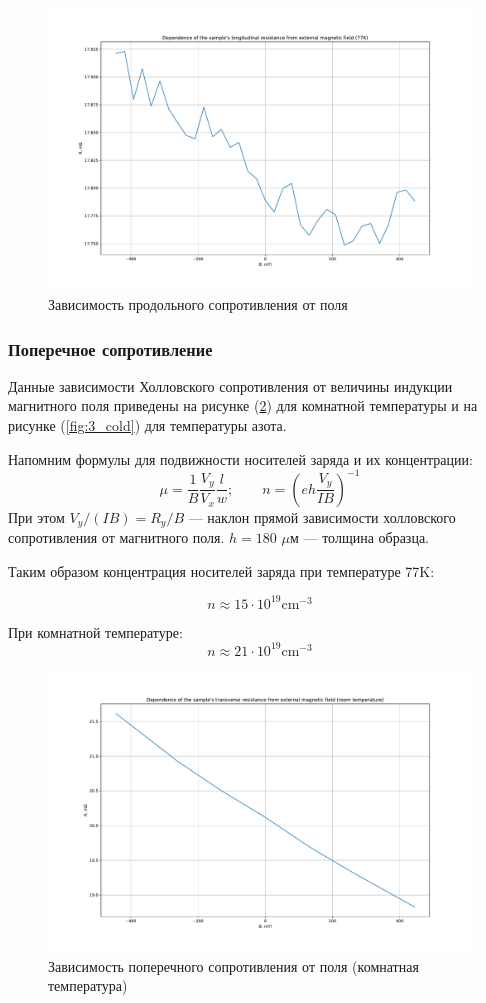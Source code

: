 \documentclass[a4paper, 12pt]{article}
\begin{document}
\begin{figure}[H]
	\centering
	\includegraphics[width=\linewidth]{3_longitudunal.pdf}
	\caption{Зависимость продольного сопротивления от поля}
	\label{fig:3_long}
\end{figure}

\subsubsection{Поперечное сопротивление}

Данные зависимости Холловского сопротивления от величины индукции магнитного поля приведены на рисунке (\ref{fig:3_room}) для комнатной температуры и на рисунке (\ref{fig:3_cold}) для температуры азота.

Напомним формулы для подвижности носителей заряда и их концентрации:
$$\mu=\frac{1}{B}\frac{V_y}{V_x}\frac{l}{w}; \qquad n=\left(eh\frac{V_y}{IB}\right)^{-1}  $$
При этом $V_y/(IB) = R_y/B$ --- наклон прямой зависимости холловского сопротивления от магнитного поля. $h = 180$ $\mu$м --- толщина образца.

Таким образом концентрация носителей заряда при температуре 77K:

$$n\approx15 \cdot 10^{19}\text{cm}^{-3}$$ 

При комнатной температуре:
$$n\approx21 \cdot 10^{19}\text{cm}^{-3}$$ 
\begin{figure}[H]
	\centering
	\includegraphics[width=0.8\linewidth]{3_room.pdf}
	\caption{Зависимость поперечного сопротивления от поля (комнатная температура)}
	\label{fig:3_room}
\end{figure}
\end{document}

